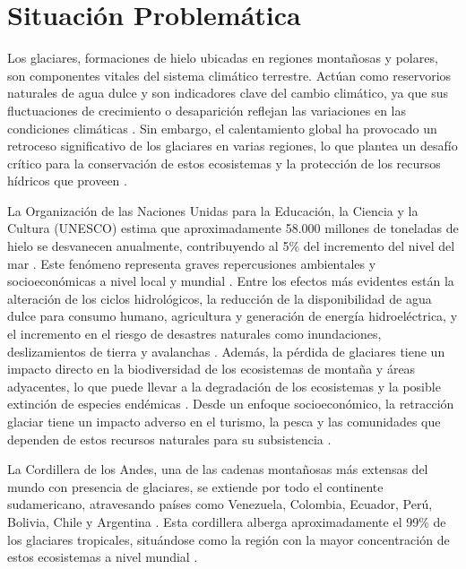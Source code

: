 \section{Situación Problemática}
\label{sec:SituacionProblematica}

Los glaciares, formaciones de hielo ubicadas en regiones montañosas y polares, son componentes vitales del sistema climático terrestre. Actúan como reservorios naturales de agua dulce y son indicadores clave del cambio climático, ya que sus fluctuaciones de crecimiento o desaparición reflejan las variaciones en las condiciones climáticas \cite{johansen2019atlas}. Sin embargo, el calentamiento global ha provocado un retroceso significativo de los glaciares en varias regiones, lo que plantea un desafío crítico para la conservación de estos ecosistemas y la protección de los recursos hídricos que proveen \cite{ali2023intimidating, rounce2023global}.

La Organización de las Naciones Unidas para la Educación, la Ciencia y la Cultura (UNESCO) estima que aproximadamente 58.000 millones de toneladas de hielo se desvanecen anualmente, contribuyendo al 5\% del incremento del nivel del mar \cite{carvalho2022world}. Este fenómeno representa graves repercusiones ambientales y socioeconómicas a nivel local y mundial \cite{mark2017glacier, nie2021glacial, clague2023impacts}. Entre los efectos más evidentes están la alteración de los ciclos hidrológicos, la reducción de la disponibilidad de agua dulce para consumo humano, agricultura y generación de energía hidroeléctrica, y el incremento en el riesgo de desastres naturales como inundaciones, deslizamientos de tierra y avalanchas \cite{motschmann2020losses}. Además, la pérdida de glaciares tiene un impacto directo en la biodiversidad de los ecosistemas de montaña y áreas adyacentes, lo que puede llevar a la degradación de los ecosistemas y la posible extinción de especies endémicas \cite{palomo2017climate}. Desde un enfoque socioeconómico, la retracción glaciar tiene un impacto adverso en el turismo, la pesca y las comunidades que dependen de estos recursos naturales para su subsistencia \cite{rasul2019global}.

La Cordillera de los Andes, una de las cadenas montañosas más extensas del mundo con presencia de glaciares, se extiende por todo el continente sudamericano, atravesando países como Venezuela, Colombia, Ecuador, Perú, Bolivia, Chile y Argentina \cite{johansen2019atlas}. Esta cordillera alberga aproximadamente el 99\% de los glaciares tropicales, situándose como la región con la mayor concentración de estos ecosistemas a nivel mundial \cite{veettil2019global}.

